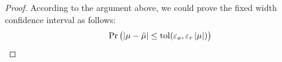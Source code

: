 \documentclass{iitthesis}
\theoremstyle{definition}
\begin{document}
\begin{proof}
According to the argument above, we could prove the fixed width confidence interval as follows:
\begin{align}
&\Pr\left (\abs{\mu-\tmu} \leq \tol(\varepsilon_a, \varepsilon_r \abs{\mu})\right)\\

\end{align}
\end{proof}
\end{document}
